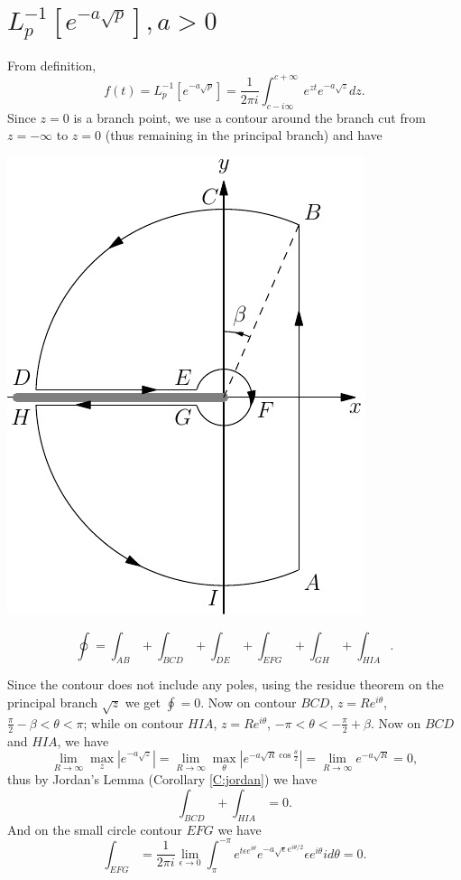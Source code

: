 \section{ $ L_p^{-1} [ e^{-a\sqrt{p}} ], a>0 $ }
From definition, 
\[
	f(t)= L_p^{-1}\left[ e^{-a\sqrt{p}} \right]
	    = \frac{1}{2\pi i} 
			  \int_{c-i\infty}^{c+\infty} 
				e^{zt} e^{-a\sqrt{z}} dz.
\]
Since $z=0$ is a branch point, we use a contour around the branch cut from
$z=-\infty$ to $z=0$ (thus remaining in the principal branch) and have

\begin{marginfigure} 
  \includegraphics{graphics/contour.pdf}
\end{marginfigure}

\[
  \oint = \int_{AB} + \int_{BCD} + \int_{DE} + \int_{EFG} + \int_{GH}
          + \int_{HIA}.
\]

Since the contour does not include any poles, using the residue theorem on the
principal branch $\sqrt{z}$ we get $\oint =0$. Now on contour $BCD$, 
$z=R e^{i\theta}$, $\frac{\pi}{2}-\beta <\theta <\pi$; while on contour $HIA$, 
$z=R e^{i\theta}$, $-\pi <\theta < -\frac{\pi}{2}+\beta$. Now on $BCD$ and
$HIA$, we have
\[
	\lim_{R\to \infty} \max_z |e^{-a\sqrt{z}}|
	= \lim_{R\to \infty} \max_{\theta} | e^{-a\sqrt{R} \cos\frac{\theta}{2}} |
	= \lim_{R\to \infty} e^{-a\sqrt{R}}
	= 0,
\]
thus by Jordan's Lemma (Corollary \ref{C:jordan}) we have
\[
  \int_{BCD} + \int_{HIA} = 0.
\]
And on the small circle contour $EFG$ we have
\[
	\int_{EFG} 
	= \frac{1}{2\pi i} 
	  \lim_{\epsilon\to 0} \int_{\pi}^{-\pi} e^{t\epsilon e^{i\theta}}
	    e^{-a\sqrt{\epsilon} e^{i\theta /2}} \epsilon e^{i\theta} i d\theta
	= 0.
\]

